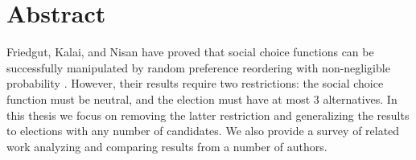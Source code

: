 
\chapter*{Abstract}

Friedgut, Kalai, and Nisan have proved that social choice functions can be successfully manipulated by random preference reordering with non-negligible probability \cite{friedgut2008elections}. However, their results require two restrictions: the social choice function must be neutral, and the election must have at most 3 alternatives. In this thesis we focus on removing the latter restriction and generalizing the results to elections with any number of candidates. We also provide a survey of related work analyzing and comparing results from a number of authors.
